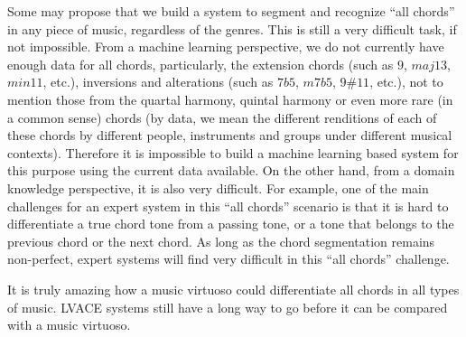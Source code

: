 Some may propose that we build a system to segment and recognize ``all chords'' in any piece of music, regardless of the genres. This is still a very difficult task, if not impossible. From a machine learning perspective, we do not currently have enough data for all chords, particularly, the extension chords (such as $9$, $maj13$, $min11$, etc.), inversions and alterations (such as $7b5$, $m7b5$, $9\#11$, etc.), not to mention those from the quartal harmony, quintal harmony or even more rare (in a common sense) chords (by data, we mean the different renditions of each of these chords by different people, instruments and groups under different musical contexts). Therefore it is impossible to build a machine learning based system for this purpose using the current data available. On the other hand, from a domain knowledge perspective, it is also very difficult. For example, one of the main challenges for an expert system in this ``all chords'' scenario is that it is hard to differentiate a true chord tone from a passing tone, or a tone that belongs to the previous chord or the next chord. As long as the chord segmentation remains non-perfect, expert systems will find very difficult in this ``all chords'' challenge.

It is truly amazing how a music virtuoso could differentiate all chords in all types of music. LVACE systems still have a long way to go before it can be compared with a music virtuoso.



